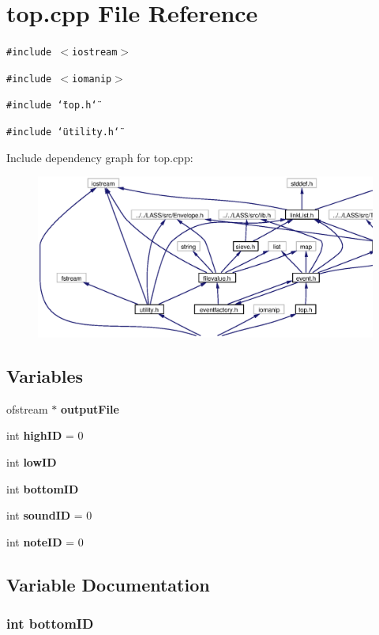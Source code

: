 \section{top.cpp File Reference}
\label{top_8cpp}
{\tt \#include $<$iostream$>$}\par
{\tt \#include $<$iomanip$>$}\par
{\tt \#include \char`\"{}top.h\char`\"{}}\par
{\tt \#include \char`\"{}utility.h\char`\"{}}\par


Include dependency graph for top.cpp:\begin{figure}[H]
\begin{center}
\leavevmode
\includegraphics[width=365pt]{top_8cpp__incl}
\end{center}
\end{figure}
\subsection*{Variables}
\begin{CompactItemize}
\item 
ofstream $\ast$ {\bf output\-File}
\item 
int {\bf high\-ID} = 0
\item 
int {\bf low\-ID}
\item 
int {\bf bottom\-ID}
\item 
int {\bf sound\-ID} = 0
\item 
int {\bf note\-ID} = 0
\end{CompactItemize}


\subsection{Variable Documentation}
\subsubsection{\setlength{\rightskip}{0pt plus 5cm}int {\bf bottom\-ID}}\label{top_8cpp_a3}




